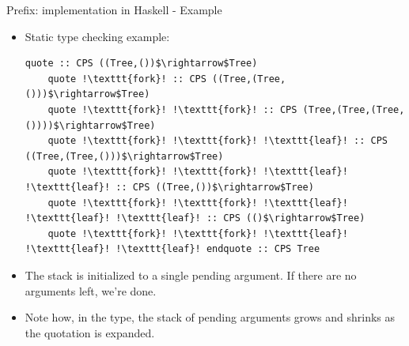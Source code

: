 \documentclass[10pt]{beamer}
\begin{document}
\begin{frame}[fragile]{Prefix: implementation in Haskell - Example}

\begin{itemize}

\item Static type checking example:

\begin{lstlisting}[mathescape=true, escapechar=!]
	quote :: CPS ((Tree,())$\rightarrow$Tree)
	quote !\texttt{fork}! :: CPS ((Tree,(Tree,()))$\rightarrow$Tree)
	quote !\texttt{fork}! !\texttt{fork}! :: CPS (Tree,(Tree,(Tree,())))$\rightarrow$Tree)
	quote !\texttt{fork}! !\texttt{fork}! !\texttt{leaf}! :: CPS ((Tree,(Tree,()))$\rightarrow$Tree)
	quote !\texttt{fork}! !\texttt{fork}! !\texttt{leaf}! !\texttt{leaf}! :: CPS ((Tree,())$\rightarrow$Tree)
	quote !\texttt{fork}! !\texttt{fork}! !\texttt{leaf}! !\texttt{leaf}! !\texttt{leaf}! :: CPS (()$\rightarrow$Tree)
	quote !\texttt{fork}! !\texttt{fork}! !\texttt{leaf}! !\texttt{leaf}! !\texttt{leaf}! endquote :: CPS Tree
\end{lstlisting}

\item The stack is initialized to a single pending argument. If there are no arguments left, we're done.
\item Note how, in the type, the stack of pending arguments grows and shrinks as the quotation is expanded.


\end{itemize}

\end{frame}
\end{document}
